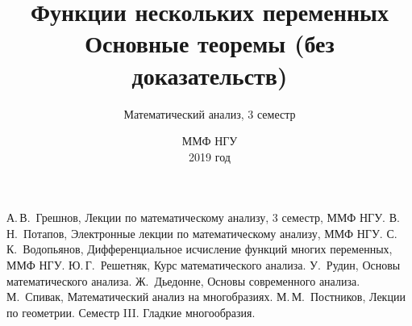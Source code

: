 \documentclass[oneside, final]{book}
\title{\textbf{Функции нескольких переменных}\\ Основные теоремы (без доказательств)}
\author{Математический анализ, 3 семестр}
\date{ММФ НГУ\\ \vfill2019 год}
\theoremstyle{plain}
\theoremstyle{definition}
\begin{document}
	\maketitle

	\tableofcontents
	
	

	
		
	
	
	\begin{thebibliography}{0}
		 А.\,В.~Грешнов, Лекции по математическому анализу, 3 семестр, ММФ НГУ.
		 В.\,Н.~Потапов, Электронные лекции по математическому анализу, ММФ НГУ.
		 С.\,К.~Водопьянов, Дифференциальное исчисление функций многих переменных, ММФ НГУ.
		 Ю.\,Г.~Решетняк, Курс математического анализа.
		 У.~Рудин, Основы математического анализа.
		 Ж.~Дьедонне, Основы современного анализа.
		 М.~Спивак, Математический анализ на многобразиях.
		 М.\,М.~Постников, Лекции по геометрии. Семестр III. Гладкие многообразия.
	\end{thebibliography}
\end{document}
